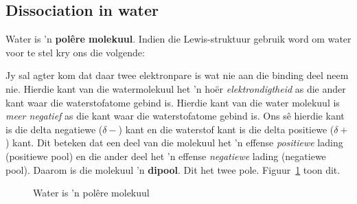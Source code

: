            \subsection*{Dissociation in water}
            \nopagebreak
        \label{m38720*id335324}Water is  'n \textbf{pol\^{e}re molekuul}. Indien die Lewis-struktuur gebruik word om water voor te stel kry ons die volgende:
\begin{figure}[H]
\begin{center}
\end{center}
\end{figure}
Jy sal agter kom dat daar twee elektronpare is wat nie aan die binding deel neem nie. Hierdie kant van die watermolekuul het  'n ho\"{e}r \textsl{elektrondigtheid} as die ander kant waar die waterstofatome gebind is. Hierdie kant van die water molekuul is \textsl{meer negatief} as die kant waar die waterstofatome gebind is. Ons s\^{e} hierdie kant is die delta negatiewe ($\delta -$) kant en die waterstof kant is die delta positiewe ($\delta +$) kant. Dit beteken dat een deel van die molekuul het  'n effense \textsl{positiewe} lading (positiewe pool) en die ander deel het  'n effense \textsl{negatiewe} lading (negatiewe pool). Daarom is die molekuul  'n \textbf{dipool}. Dit het twee pole. Figuur~\ref{fig:hydrosphere:water} toon dit.\par 
    \setcounter{subfigure}{0}
\begin{figure}[H]
\begin{center}
\end{center}
\caption{Water is  'n pol\^{e}re molekuul}
\label{fig:hydrosphere:water}
\end{figure}

